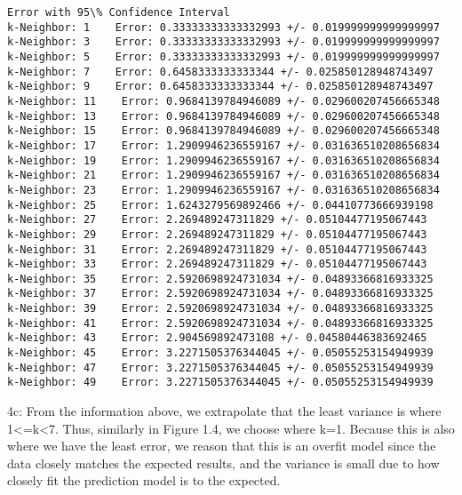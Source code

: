 \documentclass[11pt]{article}
\begin{document}
    \begin{Verbatim}[commandchars=\\\{\}]
Error with 95\% Confidence Interval
k-Neighbor: 1    Error: 0.33333333333332993 +/- 0.019999999999999997
k-Neighbor: 3    Error: 0.33333333333332993 +/- 0.019999999999999997
k-Neighbor: 5    Error: 0.33333333333332993 +/- 0.019999999999999997
k-Neighbor: 7    Error: 0.6458333333333344 +/- 0.025850128948743497
k-Neighbor: 9    Error: 0.6458333333333344 +/- 0.025850128948743497
k-Neighbor: 11    Error: 0.9684139784946089 +/- 0.029600207456665348
k-Neighbor: 13    Error: 0.9684139784946089 +/- 0.029600207456665348
k-Neighbor: 15    Error: 0.9684139784946089 +/- 0.029600207456665348
k-Neighbor: 17    Error: 1.2909946236559167 +/- 0.031636510208656834
k-Neighbor: 19    Error: 1.2909946236559167 +/- 0.031636510208656834
k-Neighbor: 21    Error: 1.2909946236559167 +/- 0.031636510208656834
k-Neighbor: 23    Error: 1.2909946236559167 +/- 0.031636510208656834
k-Neighbor: 25    Error: 1.6243279569892466 +/- 0.04410773666939198
k-Neighbor: 27    Error: 2.269489247311829 +/- 0.05104477195067443
k-Neighbor: 29    Error: 2.269489247311829 +/- 0.05104477195067443
k-Neighbor: 31    Error: 2.269489247311829 +/- 0.05104477195067443
k-Neighbor: 33    Error: 2.269489247311829 +/- 0.05104477195067443
k-Neighbor: 35    Error: 2.5920698924731034 +/- 0.04893366816933325
k-Neighbor: 37    Error: 2.5920698924731034 +/- 0.04893366816933325
k-Neighbor: 39    Error: 2.5920698924731034 +/- 0.04893366816933325
k-Neighbor: 41    Error: 2.5920698924731034 +/- 0.04893366816933325
k-Neighbor: 43    Error: 2.904569892473108 +/- 0.04580446383692465
k-Neighbor: 45    Error: 3.2271505376344045 +/- 0.05055253154949939
k-Neighbor: 47    Error: 3.2271505376344045 +/- 0.05055253154949939
k-Neighbor: 49    Error: 3.2271505376344045 +/- 0.05055253154949939

    \end{Verbatim}

    4c: From the information above, we extrapolate that the least variance
is where 1\textless{}=k\textless{}7. Thus, similarly in Figure 1.4, we
choose where k=1. Because this is also where we have the least error, we
reason that this is an overfit model since the data closely matches the
expected results, and the variance is small due to how closely fit the
prediction model is to the expected.


    
    
    
    
\end{document}

